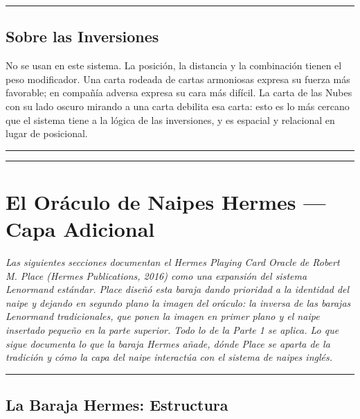 \begin{center}\rule{0.5\linewidth}{0.5pt}\end{center}

\section{Sobre las Inversiones}\label{on-reversals}

No se usan en este sistema. La posición, la distancia y la combinación tienen el peso modificador. Una carta rodeada de cartas armoniosas expresa su fuerza más favorable; en compañía adversa expresa su cara más difícil. La carta de las Nubes con su lado oscuro mirando a una carta debilita esa carta: esto es lo más cercano que el sistema tiene a la lógica de las inversiones, y es espacial y relacional en lugar de posicional.

\begin{center}\rule{0.5\linewidth}{0.5pt}\end{center}

\begin{center}\rule{0.5\linewidth}{0.5pt}\end{center}

\chapter{El Oráculo de Naipes Hermes --- Capa Adicional}\label{the-hermes-playing-card-oracle--additional-layer}

\emph{Las siguientes secciones documentan el Hermes Playing Card Oracle de Robert M. Place (Hermes Publications, 2016) como una expansión del sistema Lenormand estándar. Place diseñó esta baraja dando prioridad a la identidad del naipe y dejando en segundo plano la imagen del oráculo: la inversa de las barajas Lenormand tradicionales, que ponen la imagen en primer plano y el naipe insertado pequeño en la parte superior. Todo lo de la Parte 1 se aplica. Lo que sigue documenta lo que la baraja Hermes añade, dónde Place se aparta de la tradición y cómo la capa del naipe interactúa con el sistema de naipes inglés.}

\begin{center}\rule{0.5\linewidth}{0.5pt}\end{center}

\section{La Baraja Hermes: Estructura}\label{the-hermes-deck-structure}

